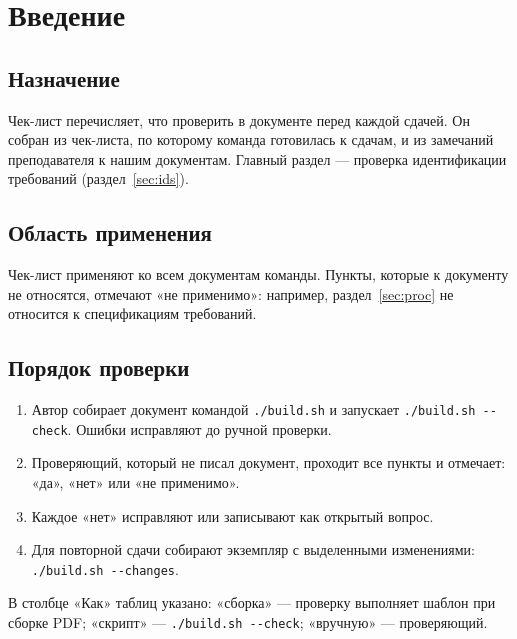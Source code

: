 \documentclass{tpks}
\begin{document}
\makeheader
\begin{changelog}
\end{changelog}

\section{Введение}

\subsection{Назначение}
Чек-лист перечисляет, что проверить в документе перед каждой сдачей. Он собран из чек-листа, по которому команда готовилась к сдачам, и из замечаний преподавателя к нашим документам. Главный раздел --- проверка идентификации требований (раздел~\ref{sec:ids}).

\subsection{Область применения}
Чек-лист применяют ко всем документам команды. Пункты, которые к документу не относятся, отмечают «не применимо»: например, раздел~\ref{sec:proc} не относится к спецификациям требований.

\subsection{Порядок проверки}
\begin{enumerate}
  \item Автор собирает документ командой \texttt{./build.sh} и запускает \texttt{./build.sh -{}-check}. Ошибки исправляют до ручной проверки.
  \item Проверяющий, который не писал документ, проходит все пункты и отмечает: «да», «нет» или «не применимо».
  \item Каждое «нет» исправляют или записывают как открытый вопрос.
  \item Для повторной сдачи собирают экземпляр с выделенными изменениями: \texttt{./build.sh -{}-changes}.
\end{enumerate}

В столбце «Как» таблиц указано: «сборка» --- проверку выполняет шаблон при сборке PDF; «скрипт» --- \texttt{./build.sh -{}-check}; «вручную» --- проверяющий.
\end{document}
